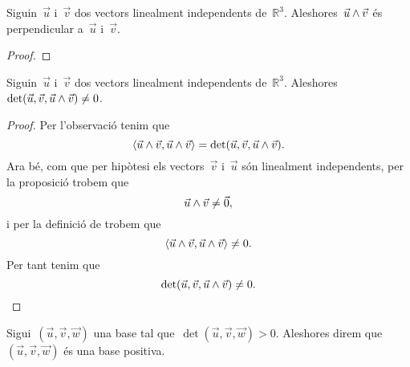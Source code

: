 \documentclass[../../main.tex]{subfiles}
\begin{document}
	\begin{proposition}
		\label{prop:dos vectors linealment independents són perpendiculars al seu producte vectorial}
		\label{prop:el producte vectorial és perpendicular als vectors}
		Siguin~\(\vec{u}\) i~\(\vec{v}\) dos vectors linealment independents de~\(\mathbb{R}^{3}\).
		Aleshores~\(\vec{u}\mathbin{\wedge}\vec{v}\) és perpendicular a~\(\vec{u}\) i~\(\vec{v}\).
		\begin{proof}
		\end{proof}
	\end{proposition}
	\begin{proposition}
		\label{prop:el determinant de dos vectors linealment independents i el seu producte vectorial és diferent de zero}
		Siguin~\(\vec{u}\) i~\(\vec{v}\) dos vectors linealment independents de~\(\mathbb{R}^{3}\).
		Aleshores~\(\det(\vec{u},\vec{v},\vec{u}\mathbin{\wedge}\vec{v})\neq0\).
		\begin{proof}
			Per l'observació  tenim que
			\[
			    \prodesc{\vec{u}\prodvec\vec{v}}{\vec{u}\prodvec\vec{v}}=\det(\vec{u},\vec{v},\vec{u}\prodvec\vec{v}).
			\]
			Ara bé, com que per hipòtesi els vectors~\(\vec{v}\) i~\(\vec{u}\) són linealment independents, per la proposició  trobem que
			\[
			    \vec{u}\mathbin{\wedge}\vec{v}\neq\vec{0},
			\]
			i per la definició de  trobem que
			\[
			    \prodesc{\vec{u}\prodvec\vec{v}}{\vec{u}\prodvec\vec{v}}\neq0.
			\]
			Per tant tenim que
			\[
			    \det(\vec{u},\vec{v},\vec{u}\mathbin{\wedge}\vec{v})\neq0.\qedhere
			\]
		\end{proof}
	\end{proposition}
	\begin{definition}
		\label{orientació d'una base}
		\label{def:base positiva}
		Sigui~\((\vec{u},\vec{v},\vec{w})\) una base tal que~\(\det(\vec{u},\vec{v},\vec{w})>0\).
		Aleshores direm que~\((\vec{u},\vec{v},\vec{w})\) és una base positiva.
	\end{definition}
\end{document}
